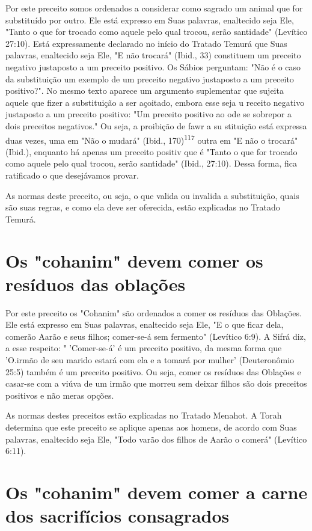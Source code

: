 \begin{itemize}
\begin{enumrate}
\begin{itemize}
\begin{itemize}
Por este preceito somos ordenados a considerar como sagrado um animal
que for substituído por outro. Ele está expresso em Suas palavras,
enalte­cido seja Ele, "Tanto o que for trocado como aquele pelo qual
trocou, serão san­tidade" (Levítico 27:10). Está expressamente declarado
no início do Tratado Te­murá que Suas palavras, enaltecido seja Ele, "E
não trocará" (Ibid., 33) consti­tuem um preceito negativo justaposto a
um preceito positivo. Os Sábios pergun­tam: "Não é o caso da
substituição um exemplo de um preceito negativo justa­posto a um
preceito positivo?". No mesmo texto aparece um argumento suple­mentar
que sujeita aquele que fizer a substituição a ser açoitado, embora esse
seja u receito negativo justaposto a um preceito positivo: "Um preceito
posi­tivo ao ode se sobrepor a dois preceitos negativos." Ou seja, a
proibição de fawr a su stituição está expressa duas vezes, uma em "Não o
mudará" (Ibid., 170)\textsuperscript{117} outra em "E não o trocará"
(Ibid.), enquanto há apenas um preceito positiv que é "Tanto o que for
trocado como aquele pelo qual trocou, serão santidade" (Ibid., 27:10).
Dessa forma, fica ratificado o que desejávamos provar.

As normas deste preceito, ou seja, o que valida ou invalida a
substi­tuição, quais são suas regras, e como ela deve ser oferecida,
estão explicadas no Tratado Temurá.


\section{Os "cohanim" devem comer os resíduos das oblações}

Por este preceito os "Cohanim" são ordenados a comer os resíduos das
Oblações. Ele está expresso em Suas palavras, enaltecido seja Ele, "E o
que ficar dela, comerão Aarão e seus filhos; comer-se-á sem fermento"
(Levítico 6:9). A Sifrá diz, a esse respeito: " 'Comer-se-á' é um
preceito positivo, da mesma forma que 'O.irmão de seu
marido estará com ela e a tomará por mulher' (Deu­teronômio 25:5) também
é um preceito positivo. Ou seja, comer os resíduos das Oblações e
casar-se com a viúva de um irmão que morreu sem deixar filhos são dois
preceitos positivos e não meras opções.

As normas destes preceitos estão explicadas no Tratado Menahot. A Torah
determina que este preceito se aplique apenas aos homens, de acordo com
Suas palavras, enaltecido seja Ele, "Todo varão dos filhos de Aarão o
co­merá" (Levítico 6:11).

\section{Os "cohanim" devem comer a carne dos sacrifícios consagrados}


\end{itemize}
\end{itemize}
\end{enumrate}
\end{itemize}
